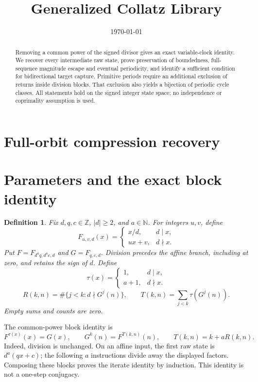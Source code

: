 \documentclass[11pt,letterpaper]{article}
\title{Generalized Collatz Library}
\author{}
\date{\today}
\newcommand{\N}{\mathbb{N}}
\newcommand{\Z}{\mathbb{Z}}
\newtheorem{definition}[theorem]{Definition}
\begin{document}
\maketitle
\section*{Full-orbit compression recovery}

\begin{abstract}
Removing a common power of the signed divisor gives an exact variable-clock
identity. We recover every intermediate raw state, prove preservation of
boundedness, full-sequence magnitude escape and eventual periodicity, and
identify a sufficient condition for bidirectional target capture. Primitive
periods require an additional exclusion of returns inside division blocks.
That exclusion also yields a bijection of periodic cycle classes. All statements
hold on the signed integer state space; no independence or coprimality
assumption is used.
\end{abstract}

\section{Parameters and the exact block identity}

\begin{definition}
Fix \(d,q,c\in\Z\), \(|d|\ge2\), and \(a\in\N\). For integers \(u,v\), define
\[
F_{u,v,d}(x)=\begin{cases}x/d,&d\mid x,\\ux+v,&d\nmid x.\end{cases}
\]
Put \(F=F_{d^a q,d^a c,d}\) and \(G=F_{q,c,d}\). Division precedes the affine
branch, including at zero, and retains the sign of \(d\). Define
\[
\tau(x)=\begin{cases}1,&d\mid x,\\a+1,&d\nmid x.\end{cases}
\]
\[
R(k,n)=\#\{j<k:d\nmid G^j(n)\},\qquad
T(k,n)=\sum_{j<k}\tau(G^j(n)).
\]
Empty sums and counts are zero.
\end{definition}

The common-power block identity \cite{AscendCompressionI} is
\begin{equation}\label{BlockIdentity}
F^{\tau(x)}(x)=G(x),\qquad
G^k(n)=F^{T(k,n)}(n),\qquad T(k,n)=k+aR(k,n).
\end{equation}
Indeed, division is unchanged. On an affine input, the first raw state is
\(d^a(qx+c)\); the following \(a\) instructions divide away the displayed
factors. Composing these blocks proves the iterate identity by induction.
This identity is not a one-step conjugacy.
\end{document}
